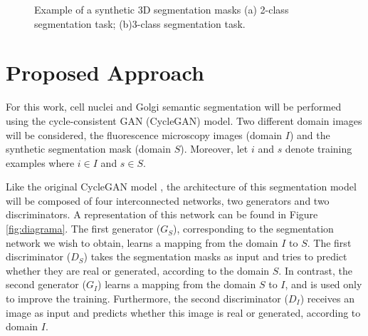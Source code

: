 \begin{figure}[!htb]
	\centering
	\hfil
	\caption{Example of a synthetic 3D segmentation masks (a) 2-class segmentation task; (b)3-class segmentation task.}
	\label{fig:sintetica}
\end{figure}


\section{Proposed Approach}
\label{section:proposed}

For this work, cell nuclei and Golgi semantic segmentation will be performed using the cycle-consistent GAN (CycleGAN) model. Two different domain images will be considered, the fluorescence microscopy images (domain $I$) and the synthetic segmentation mask (domain $S$). Moreover, let $i$ and $s$ denote training examples where $i \in I$ and $s \in S$.

Like the original CycleGAN model \cite{cycleGAN:original}, the architecture of this segmentation model will be composed of four interconnected networks, two generators and two discriminators. A representation of this network can be found in Figure \ref{fig:diagrama}. The first generator ($G_S$), corresponding to the segmentation network we wish to obtain, learns a mapping from the domain $I$ to $S$. The first discriminator ($D_S$) takes the segmentation masks as input and tries to predict whether they are real or generated, according to the domain $S$. In contrast, the second generator ($G_I$) learns a mapping from the domain $S$ to $I$, and is used only to improve the training. Furthermore, the second discriminator ($D_I$) receives an image as input and predicts whether this image is real or generated, according to domain $I$.

